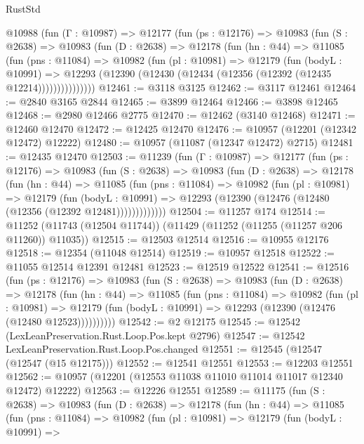 \begin{lexlean}{RustStd}
\begin{coremodule}
    @10988
      (fun (Γ : @10987) =>
      @12177
        (fun (ps : @12176) =>
        @10983
          (fun (S : @2638) =>
          @10983
            (fun (D : @2638) =>
            @12178
              (fun (hn : @44) =>
              @11085
                (fun (pns : @11084) =>
                @10982
                  (fun (pl : @10981) =>
                  @12179
                    (fun (bodyL : @10991) =>
                    @12293 (@12390 (@12430 (@12434 (@12356 (@12392 (@12435 @12214)))))))))))))))
@12461 := @3118 @3125
@12462 := @3117 @12461
@12464 := @2840 @3165 @2844
@12465 := @3899 @12464
@12466 := @3898 @12465
@12468 := @2980 @12466 @2775
@12470 := @12462 (@3140 @12468)
@12471 := @12460 @12470
@12472 := @12425 @12470
@12476 := @10957 (@12201 (@12342 @12472) @12222)
@12480 := @10957 (@11087 (@12347 @12472) @2715)
@12481 := @12435 @12470
@12503 := @11239
    (fun (Γ : @10987) =>
    @12177
      (fun (ps : @12176) =>
      @10983
        (fun (S : @2638) =>
        @10983
          (fun (D : @2638) =>
          @12178
            (fun (hn : @44) =>
            @11085
              (fun (pns : @11084) =>
              @10982
                (fun (pl : @10981) =>
                @12179
                  (fun (bodyL : @10991) =>
                  @12293 (@12390 (@12476 (@12480 (@12356 (@12392 @12481)))))))))))))
@12504 := @11257 @174
@12514 := @11252 (@11743 (@12504 @11744)) (@11429 (@11252 (@11255 (@11257 @206 @11260)) @11035))
@12515 := @12503 @12514
@12516 := @10955 @12176
@12518 := @12354 (@11048 @12514)
@12519 := @10957 @12518
@12522 := @11055 @12514 @12391 @12481
@12523 := @12519 @12522
@12541 := @12516
    (fun (ps : @12176) =>
    @10983
      (fun (S : @2638) =>
      @10983
        (fun (D : @2638) =>
        @12178
          (fun (hn : @44) =>
          @11085
            (fun (pns : @11084) =>
            @10982
              (fun (pl : @10981) =>
              @12179 (fun (bodyL : @10991) => @12293 (@12390 (@12476 (@12480 @12523))))))))))
@12542 := @2 @12175
@12545 := @12542 (LexLeanPreservation.Rust.Loop.Pos.kept @2796)
@12547 := @12542 LexLeanPreservation.Rust.Loop.Pos.changed
@12551 := @12545 (@12547 (@12547 (@15 @12175)))
@12552 := @12541 @12551
@12553 := @12203 @12551
@12562 := @10957 (@12201 (@12553 @11038 @11010 @11014 @11017 @12340 @12472) @12222)
@12563 := @12226 @12551
@12589 := @11175
    (fun (S : @2638) =>
    @10983
      (fun (D : @2638) =>
      @12178
        (fun (hn : @44) =>
        @11085
          (fun (pns : @11084) =>
          @10982
            (fun (pl : @10981) =>
            @12179
              (fun (bodyL : @10991) =>

\end{coremodule}
\end{lexlean}
